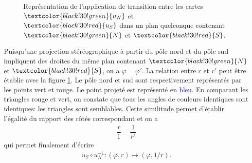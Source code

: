 \begin{figure}[h!]
    \caption{Représentation de l'application de transition entre les cartes $\textcolor{black!30!green}{u_N}$ et $\textcolor{black!30!red}{u_S}$ dans un plan quelconque contenant $\textcolor{black!30!green}{N}$ et $\textcolor{black!30!red}{S}$.\label{fig1}}
\end{figure}
\newpage
Puisqu'une projection stéréographique à partir du pôle nord et du pôle sud impliquent des droites du même plan contenant $\textcolor{black!30!green}{N}$ et $\textcolor{black!30!red}{S}$, on a $\varphi = \varphi'$. La relation entre $r$ et $r'$ peut être établie avec la figure \ref{fig1}. Le pôle nord et sud sont respectivement représentés par les points \textcolor{black!30!green}{vert} et \textcolor{black!30!red}{rouge}. Le point projeté est représenté en \textcolor{blue}{bleu}. En comparant les triangles rouge et vert, on constate que tous les angles de couleurs identiques sont identiques: les triangles sont semblables. Cette similitude permet d'établir l'égalité du rapport des côtés correspondant et on a 
\begin{align*}
    \dfrac{r}{1}  = \dfrac{1}{r'}
\end{align*}
qui permet finalement d'écrire 
\begin{align*}
    u_S \circ u_N^{-1}: (\varphi, r) \mapsto (\varphi, 1/r).
\end{align*}
